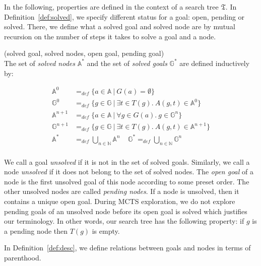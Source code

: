 \documentclass[runningheads,a4paper,draft]{svjour3}
\begin{document}
In the following, properties are defined in the context of a
search tree $\mathfrak{T}$. In Definition~\ref{def:solved}, we specify
different status for a goal: open, pending or solved. There, we define
what a solved goal and solved node are by mutual recursion on the number of
steps it takes to solve a goal and a node.
\begin{definition}\label{def:solved}(solved goal, solved nodes, open goal,
pending goal)\\
The set of \textit{solved nodes} $\mathbb{A}^*$ and
the set of \textit{solved goals} $\mathbb{G}^*$ are defined inductively by:

\begin{align*}
\mathbb{A}^{0} &=_{def}
\lbrace a \in \mathbb{A}\ |\ G(a) = \emptyset \rbrace \\
\mathbb{G}^{0} &=_{def} \lbrace g \in \mathbb{G}\ |\
\exists t \in T(g).\ A(g,t) \in \mathbb{A}^{0} \rbrace\\
\mathbb{A}^{n+1} &=_{def} \lbrace a \in \mathbb{A}\ |\
\forall g \in G(a).\ g \in \mathbb{G}^{n} \rbrace\\
\mathbb{G}^{n+1} &=_{def} \lbrace g \in \mathbb{G}\ |\
\exists t \in T(g).\ A(g,t) \in \mathbb{A}^{n+1} \rbrace \\
\mathbb{A}^* &=_{def} \bigcup_{n \in \mathbb{N}} \mathbb{A}^n \ \ \ \ \
\mathbb{G}^* =_{def} \bigcup_{n \in \mathbb{N}} \mathbb{G}^n\\
\end{align*}

We call a goal \textit{unsolved} if it is not in the set 
of solved goals. Similarly, we call a node \textit{unsolved} if it does not 
belong to the set of solved nodes.
The \textit{open goal} of a node is the first unsolved goal of this node 
according to
some preset order. The other unsolved nodes are called \textit{pending nodes}.
If a node is unsolved, then it contains a unique open goal.
During MCTS exploration, we do not explore pending goals of an unsolved node
before its open goal is solved which justifies our terminology. In other words,
our search tree has the following property: if $g$ is a pending node then
$T(g)$ is empty.

\end{definition}


In Definition~\ref{def:desc}, we define relations between goals
and nodes in terms of parenthood.
\end{document}
